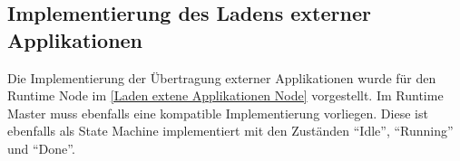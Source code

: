 \subsection{Implementierung des Ladens externer Applikationen}

Die Implementierung der Übertragung externer Applikationen wurde für den Runtime Node im \autoref{Laden extene Applikationen Node} vorgestellt. Im Runtime Master muss ebenfalls eine kompatible Implementierung vorliegen. Diese ist ebenfalls als State Machine implementiert mit den Zuständen \enquote{Idle}, \enquote{Running} und \enquote{Done}.